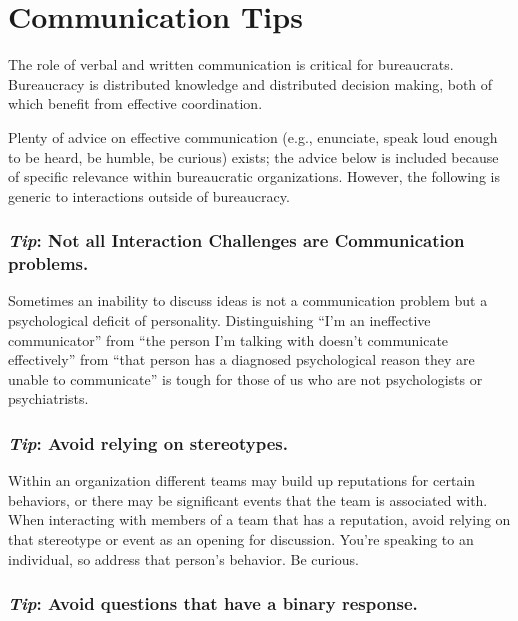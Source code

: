 \section{Communication Tips}

The role of verbal and written communication is critical for bureaucrats. Bureaucracy is distributed knowledge and distributed decision making, both of which benefit from effective coordination. 


Plenty of advice on effective communication (e.g., enunciate, speak loud enough to be heard, be humble, be curious) exists; the advice below is included because of specific relevance within bureaucratic organizations. 
However, the following is generic to interactions outside of bureaucracy. 


\subsubsection*{\textit{Tip}: Not all Interaction Challenges are Communication problems.}
Sometimes an inability to discuss ideas is not a communication problem but a psychological deficit of personality. Distinguishing ``I'm an ineffective communicator'' from ``the person I'm talking with doesn't communicate effectively'' from ``that person has a diagnosed psychological reason they are unable to communicate'' is tough for those of us who are not psychologists or psychiatrists. 


\subsubsection*{\textit{Tip}: Avoid relying on stereotypes.}
Within an organization different teams may build up reputations for certain behaviors, or there may be significant events that the team is associated with. 
When interacting with members of a team that has a reputation, avoid relying on that stereotype or event as an opening for discussion. 
You're speaking to an individual, so address that person's behavior. Be curious.



\subsubsection*{\textit{Tip}: Avoid questions that have a binary response\label{sec:yes-no-questions}.}

